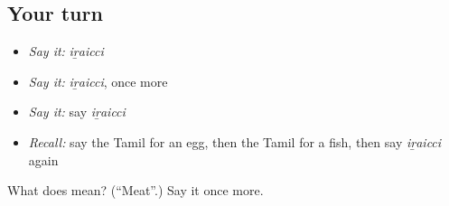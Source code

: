 \subsection*{Your turn}
\begin{itemize}
\raggedright
  \item \emph{Say it:} \emph{iṟaicci}
  \item \emph{Say it:} \emph{iṟaicci}, once more
  \item \emph{Say it:} say \emph{iṟaicci}
  \item \emph{Recall:} say the Tamil for an egg, then the Tamil for a fish, then say \emph{iṟaicci} again
\end{itemize}

\begin{tcolorbox}[breakable,colback=teal!4,colframe=teal!35!black,title={Before you move on}]
What does  mean? (\textquotedblleft{}Meat\textquotedblright{}.) Say it once more.
\end{tcolorbox}
